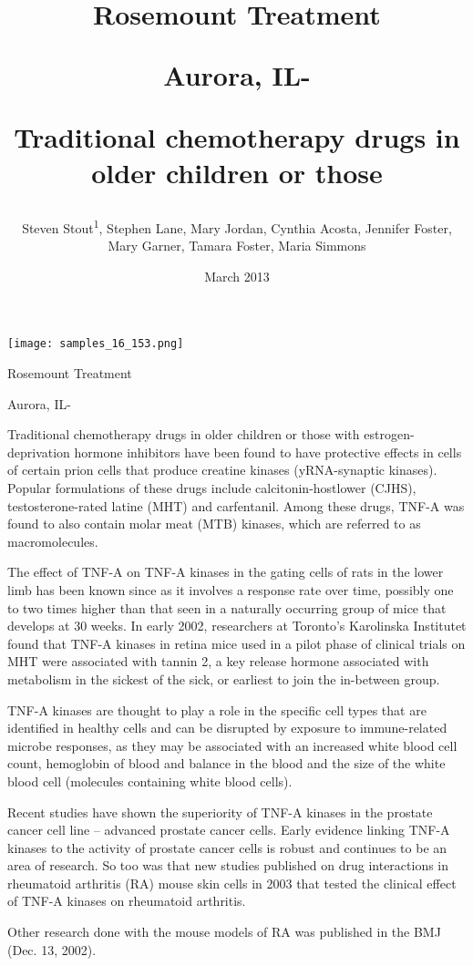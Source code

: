 \documentclass{article}
\title{Rosemount Treatment

Aurora, IL-

Traditional chemotherapy drugs in older children or those}
\author{Steven Stout\textsuperscript{1},  Stephen Lane,  Mary Jordan,  Cynthia Acosta,  Jennifer Foster,  Mary Garner,  Tamara Foster,  Maria Simmons}
\affil{\textsuperscript{1}University of Shizuoka}
\date{March 2013}
\begin{document}
\maketitle

\begin{center}
\begin{minipage}{0.75\linewidth}
\texttt{[image: samples\_16\_153.png]}
\end{minipage}
\end{center}

Rosemount Treatment

Aurora, IL-

Traditional chemotherapy drugs in older children or those with estrogen-deprivation hormone inhibitors have been found to have protective effects in cells of certain prion cells that produce creatine kinases (yRNA-synaptic kinases). Popular formulations of these drugs include calcitonin-hostlower (CJHS), testosterone-rated latine (MHT) and carfentanil. Among these drugs, TNF-A was found to also contain molar meat (MTB) kinases, which are referred to as macromolecules.

The effect of TNF-A on TNF-A kinases in the gating cells of rats in the lower limb has been known since as it involves a response rate over time, possibly one to two times higher than that seen in a naturally occurring group of mice that develops at 30 weeks. In early 2002, researchers at Toronto’s Karolinska Institutet found that TNF-A kinases in retina mice used in a pilot phase of clinical trials on MHT were associated with tannin 2, a key release hormone associated with metabolism in the sickest of the sick, or earliest to join the in-between group.

TNF-A kinases are thought to play a role in the specific cell types that are identified in healthy cells and can be disrupted by exposure to immune-related microbe responses, as they may be associated with an increased white blood cell count, hemoglobin of blood and balance in the blood and the size of the white blood cell (molecules containing white blood cells).

Recent studies have shown the superiority of TNF-A kinases in the prostate cancer cell line – advanced prostate cancer cells. Early evidence linking TNF-A kinases to the activity of prostate cancer cells is robust and continues to be an area of research. So too was that new studies published on drug interactions in rheumatoid arthritis (RA) mouse skin cells in 2003 that tested the clinical effect of TNF-A kinases on rheumatoid arthritis.

Other research done with the mouse models of RA was published in the BMJ (Dec. 13, 2002).
\end{document}
